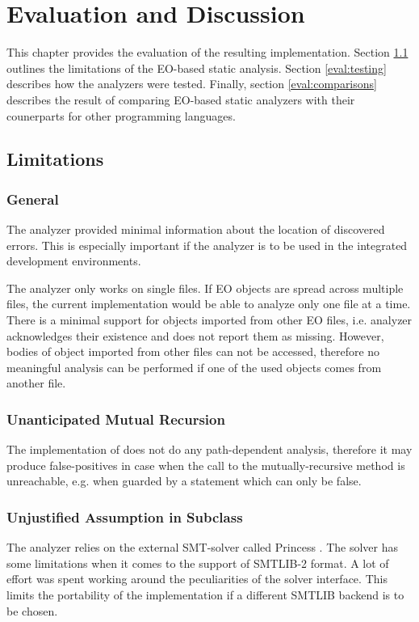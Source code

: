 \chapter{Evaluation and Discussion}
\label{chap:eval}
This chapter provides the evaluation of the resulting implementation. Section \ref{eval:limitations} outlines the limitations of the EO-based static analysis. Section \ref{eval:testing} describes how the analyzers were tested. Finally, section \ref{eval:comparisons} describes the result of comparing EO-based static analyzers with their counerparts for other programming languages.

\section{Limitations}
\label{eval:limitations}

\subsection{General}
The analyzer provided minimal information about the location of discovered errors. This is especially important if the analyzer is to be used in the integrated development environments.

The analyzer only works on single files. If EO objects are spread across multiple files, the current implementation would be able to analyze only one file at a time. There is a minimal support for objects imported from other EO files, i.e. analyzer acknowledges their existence and does not report them as missing. However, bodies of object imported from other files can not be accessed, therefore no meaningful analysis can be performed if one of the used objects comes from another file.

\subsection{Unanticipated Mutual Recursion}
The implementation of does not do any path-dependent analysis, therefore it may produce false-positives in case when the call to the mutually-recursive method is unreachable, e.g. when guarded by a statement which can only be false.

\subsection{Unjustified Assumption in Subclass}
The analyzer relies on the external SMT-solver called Princess \cite{princess}. The solver has some limitations when it comes to the support of SMTLIB-2 \cite{smtlib} format. A lot of effort was spent working around the peculiarities of the solver interface. This limits the portability of the implementation if a different SMTLIB backend is to be chosen.

